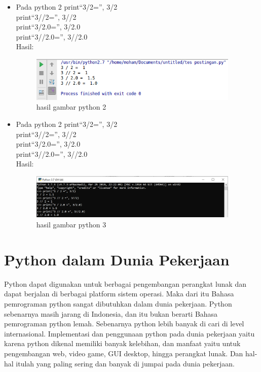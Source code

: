 \begin{enumerate}
\begin{itemize}
\item Pada python 2
			print“3/2=”, 3/2\\
			print“3//2=”, 3//2\\
			print“3/2.0=”, 3/2.0\\
			print“3//2.0=”, 3//2.0\\Hasil:\\
\begin{figure}[!htbp]
\centering
\includegraphics[width=10cm]{gambar/lima.png}
\caption{hasil gambar python 2}
\end{figure}
\item Pada python 2
			print“3/2=”, 3/2\\
			print“3//2=”, 3//2\\
			print“3/2.0=”, 3/2.0\\
			print“3//2.0=”, 3//2.0\\Hasil:\\
\begin{figure}[!htbp]
\centering
\includegraphics[width=10cm]{gambar/enam.png}
\caption{hasil gambar python 3}
\end{figure}
\end{itemize}
\end{enumerate}

\section{Python dalam Dunia Pekerjaan}
Python dapat digunakan untuk berbagai  pengembangan perangkat lunak dan dapat berjalan di berbagai platform sistem operasi. Maka dari itu Bahasa pemrograman python sangat dibutuhkan dalam dunia pekerjaan. Python sebenarnya masih jarang di Indonesia, dan itu bukan berarti Bahasa pemrograman python lemah. Sebenarnya python lebih banyak di cari di level internasional. Implementasi dan penggunaan python pada dunia pekerjaan yaitu karena python dikenal memiliki banyak kelebihan, dan manfaat yaitu untuk pengembangan web, video game, GUI desktop, hingga perangkat lunak. Dan hal- hal itulah yang paling sering dan banyak di jumpai pada dunia pekerjaan.

